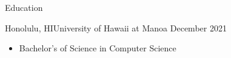 \documentclass[]{mcdowellcv}
\begin{document}
	\begin{cvsection}{Education}
		\begin{cvsubsection}{Honolulu, HI}{University of Hawaii at Manoa }{December 2021}
			\begin{itemize}
				\item Bachelor's of Science in Computer Science
			\end{itemize}
		\end{cvsubsection}
	\end{cvsection}

	
\end{document}

